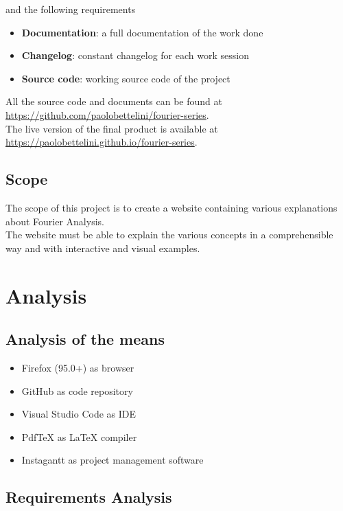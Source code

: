 \documentclass{article}
\begin{document}
and the following requirements

\begin{itemize}
    \item \textbf{Documentation}: a full documentation of the work done
    \item \textbf{Changelog}: constant changelog for each work session
    \item \textbf{Source code}: working source code of the project
\end{itemize}

All the source code and documents can be found at \href{https://github.com/paolobettelini/fourier-series}{https://github.com/paolobettelini/fourier-series}\cite{gitrepo}.
\\
The live version of the final product is available at \href{https://paolobettelini.github.io/fourier-series}{https://paolobettelini.github.io/fourier-series}\cite{gitpages}.

\subsection{Scope}

The scope of this project is to create a website containing various explanations about Fourier Analysis. \\
The website must be able to explain the various concepts in a comprehensible way and with interactive and visual examples.

\pagebreak

\section{Analysis}

\subsection{Analysis of the means}

\begin{itemize}
    \item Firefox (95.0+) as browser
    \item GitHub\cite{github} as code repository
    \item Visual Studio Code as IDE
    \item PdfTeX as LaTeX compiler
    \item Instagantt\cite{instagantt} as project management software
\end{itemize}

\subsection{Requirements Analysis}
\end{document}
